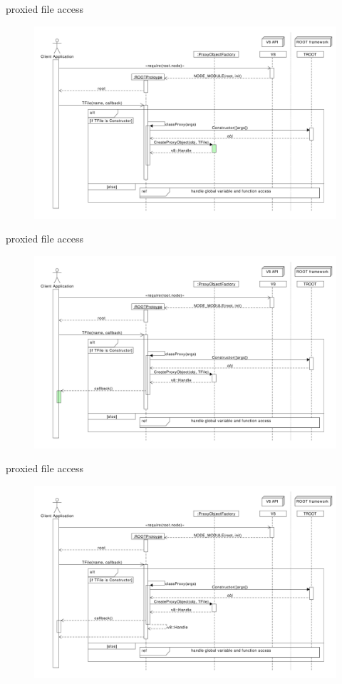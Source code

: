 \begin{frame}{proxied file access}
  \begin{figure}[htb]
    \centering
      \includegraphics[width=\textwidth, height=.85\textheight, keepaspectratio]{./resources/proxycall/fileOpen_h5.pdf}
  \end{figure}
\end{frame}

\begin{frame}{proxied file access}
  \begin{figure}[htb]
    \centering
      \includegraphics[width=\textwidth, height=.85\textheight, keepaspectratio]{./resources/proxycall/fileOpen_h6.pdf}
  \end{figure}
\end{frame}

\begin{frame}{proxied file access}
  \begin{figure}[htb]
    \centering
      \includegraphics[width=\textwidth, height=.85\textheight, keepaspectratio]{./resources/proxycall/fileOpen_h0.pdf}
  \end{figure}
\end{frame}
